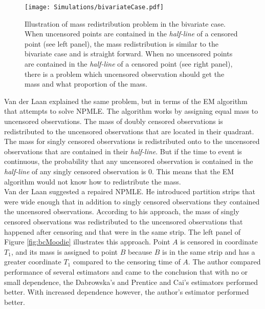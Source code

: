 \documentclass[]{article}
\begin{document}
\begin{figure}[!h]
\caption[Illustration of mass redistribution problem in the bivariate case.]{Illustration of mass redistribution problem in the bivariate case. When uncensored points are contained in the \emph{half-line} of a censored point (see left panel), the mass redistribution is similar to the bivariate case and is straight forward. When no uncensored points are contained in the \emph{half-line} of a censored point (see right panel), there is a problem which uncensored observation should get the mass and what proportion of the mass.}
\texttt{[image: Simulations/bivariateCase.pdf]}
\label{fig:bc}
\end{figure}

Van der Laan explained the same problem, but in terms of the EM algorithm that attempts to solve NPMLE. The algorithm works by assigning equal mass to uncensored observations. The mass of doubly censored observations is redistributed to the uncensored observations that are located in their quadrant. The mass for singly censored observations is redistributed onto to the uncensored observations that are contained in their \emph{half-line}. But if the time to event is continuous, the probability that any uncensored observation is contained in the \emph{half-line} of any singly censored observation is $0$. This means that the EM algorithm would not know how to redistribute the mass.\\

Van der Laan suggested a repaired NPMLE. He introduced partition strips that were wide enough that in addition to singly censored observations they contained the uncensored observations. According to his approach, the mass of singly censored observations was redistributed to the uncensored observations that happened after censoring and that were in the same strip. The left panel of Figure \ref{fig:bcMoodie} illustrates this approach. Point $A$ is censored in coordinate $T_1$, and its mass is assigned to point $B$ because $B$ is in the same strip and has a greater coordinate $T_1$ compared to the censoring time of $A$.  The author compared performance of several estimators and came to the conclusion that with no or small dependence, the Dabrowska's and Prentice and Cai's estimators performed better. With increased dependence however, the author's estimator performed better.\\
\end{document}
